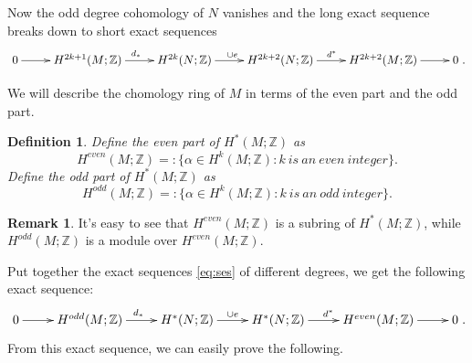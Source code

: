 \documentclass[12pt]{amsart}
\newtheorem{definition}[theorem]{Definition}
\theoremstyle{definition}
\newtheorem{remark}[theorem]{Remark}
\numberwithin{equation}{section}
\begin{document}
Now the odd degree cohomology of $N$ vanishes and the long exact
sequence breaks down to short exact sequences
\begin{equation}\label{eq:ses}
\xymatrix{
  0 \ar[r]^{} & H^{2k+1}(M;{{\mathbb{Z}}}) \ar[r]^{d_{*}} & H^{2k}(N;{{\mathbb{Z}}}) \ar[r]^{\cup e} & H^{2k+2}(N;{{\mathbb{Z}}}) \ar[r]^{d^{*}} & H^{2k+2}(M;{{\mathbb{Z}}}) \ar[r]^{} & 0
  }.
\end{equation}

We will describe the chomology ring of $M$ in terms of the even part
and the odd part.
\begin{definition}\label{def:H_e}
Define the even part of $H^{*}(M;{{\mathbb{Z}}})$ as
\begin{equation}H^{even}(M;{{\mathbb{Z}}})=: \{\alpha\in H^{k}(M;{{\mathbb{Z}}}): k \ is\  an\
even\ integer\}.\end{equation}
 Define the odd part of $H^{*}(M;{{\mathbb{Z}}})$ as
\begin{equation}H^{odd}(M;{{\mathbb{Z}}})=: \{\alpha\in H^{k}(M;{{\mathbb{Z}}}): k\  is\  an\
odd\ integer\}.\end{equation}
\end{definition}

\begin{remark}\label{rmk:H_e}
It's easy to see that $H^{even}(M;{{\mathbb{Z}}})$ is a subring of
$H^{*}(M;{{\mathbb{Z}}})$, while $H^{odd}(M;{{\mathbb{Z}}})$ is a module over
$H^{even}(M;{{\mathbb{Z}}})$.
\end{remark}

Put together the exact sequences \eqref{eq:ses} of different
degrees, we get the following exact sequence:
\begin{equation}\label{eq:grouped ses}
\xymatrix{
  0 \ar[r]^{} & H^{odd}(M;{{\mathbb{Z}}}) \ar[r]^{d_{*}} & H^{*}(N;{{\mathbb{Z}}}) \ar[r]^{\cup e} & H^{*}(N;{{\mathbb{Z}}})
\ar[r]^{d^{*}} & H^{even}(M;{{\mathbb{Z}}}) \ar[r]^{} & 0
  }.
\end{equation}
From this exact sequence, we can easily prove the following.
\end{document}
